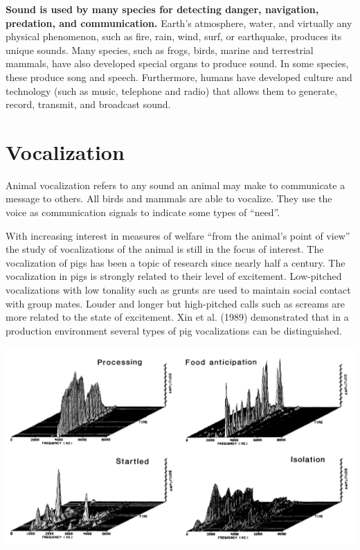 \documentclass[]{book}
\begin{document}
\textbf{Sound is used by many species for detecting danger, navigation,
predation, and communication.} Earth's atmosphere, water, and virtually
any physical phenomenon, such as fire, rain, wind, surf, or earthquake,
produces its unique sounds. Many species, such as frogs, birds, marine
and terrestrial mammals, have also developed special organs to produce
sound. In some species, these produce song and speech. Furthermore,
humans have developed culture and technology (such as music, telephone
and radio) that allows them to generate, record, transmit, and broadcast
sound.

\section{Vocalization}\label{vocalization}

Animal vocalization refers to any sound an animal may make to
communicate a message to others. All birds and mammals are able to
vocalize. They use the voice as communication signals to indicate some
types of ``need''.

With increasing interest in measures of welfare ``from the animal's
point of view'' the study of vocalizations of the animal is still in the
focus of interest. The vocalization of pigs has been a topic of research
since nearly half a century. The vocalization in pigs is strongly
related to their level of excitement. Low-pitched vocalizations with low
tonality such as grunts are used to maintain social contact with group
mates. Louder and longer but high-pitched calls such as screams are more
related to the state of excitement. Xin et al. (1989) demonstrated that
in a production environment several types of pig vocalizations can be
distinguished.

\begin{center}\includegraphics[width=1\linewidth]{figures/pig-vocal1} \end{center}
\end{document}
